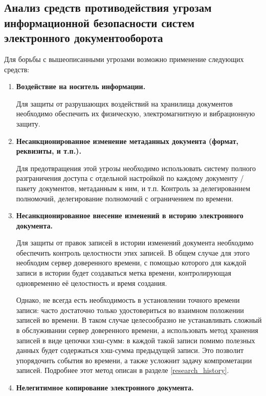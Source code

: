 \subsection{Анализ средств противодействия угрозам информационной безопасности систем электронного документооборота} \label{threats_neutralizers}

Для борьбы с вышеописанными угрозами возможно применение следующих средств:
\begin{enumerate} [label=\textbf{\arabic*}. ]
	\item \textbf{Воздействие на носитель информации.}
	\nopagebreak

	Для защиты от разрушающих воздействий на хранилища документов необходимо обеспечить их физическую, электромагнитную и вибрационную защиту.

	\item \textbf{Несанкционированное изменение метаданных документа (формат, реквизиты, и т.п.).}

	\nopagebreak
	Для предотвращения этой угрозы необходимо использовать систему полного разграничения доступа с отдельной настройкой по каждому документу / пакету документов, метаданным к ним, и т.п. Контроль за делегированием полномочий, делегирование полномочий с ограничением по времени.

	\item \textbf{Несанкционированное внесение изменений в историю электронного документа.}

	\nopagebreak
	Для защиты от правок записей в истории изменений документа необходимо обеспечить контроль целостности этих записей. В общем случае для этого необходим сервер доверенного времени, с помощью которого для каждой записи в истории будет создаваться метка времени, контролирующая одновременно её целостность и время создания.

	\vspace{\baselineskip}
	Однако, не всегда есть необходимость в установлении точного времени записи: часто достаточно только удостовериться во взаимном положении записей во времени. В таком случае целесообразно не устанавливать сложный в обслуживании сервер доверенного времени, а использовать метод хранения записей в виде цепочки хэш-сумм: в каждой такой записи помимо полезных данных будет содержаться хэш-сумма предыдущей записи. Это позволит упорядочить события во времени, а также усложнит задачу компрометации записей. Подробнее этот метод описан в разделе \ref{research_history}.

	\item \textbf{Нелегитимное копирование электронного документа.}


\end{enumerate}
